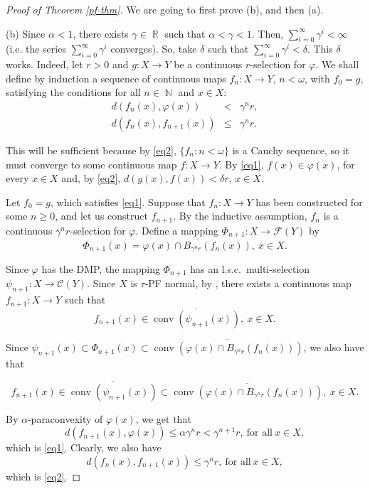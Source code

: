 \documentclass[12pt,a4paper,fleqn,leqno]{amsart}
\theoremstyle{plain}
\theoremstyle{definition}
\numberwithin{equation}{section}
\begin{document}
\begin{proof}[Proof of Theorem \ref{pf-thm}]
We are going to first prove (b), and then (a).\medskip

(b) Since $\alpha<1$, there exists $\gamma\in\operatorname{\mathbb{R}}$ such that $\alpha<\gamma<1$. Then, $\sum^\infty_{i=0}\gamma^i<\infty$ (i.e. the series $\sum^\infty_{i=0}\gamma^i$ converges). So, take $\delta$ such that $\sum_{i=0}^{\infty}\gamma^i< \delta$. This $\delta$ works.
Indeed, let $r>0$ and $g:X\to Y$ be a continuous $r$-selection for $\varphi$. We shall define by induction a sequence of continuous maps $f_n:X\to Y$, $n<\omega$, with $f_0=g$, satisfying the conditions for all $n\in\operatorname{\mathbb{N}}$ and $x\in X$:
\begin{eqnarray}
\label{eq1} d(f_n(x),\varphi(x)) & < & \gamma^nr,\\
\label{eq2} d(f_n(x),f_{n+1}(x)) & \leq &\gamma^nr.
\end{eqnarray}

This will be sufficient because by \eqref{eq2}, $\{f_n:n<\omega\}$ is a Cauchy sequence, so it must converge to some continuous map $f:X\to Y$. By \eqref{eq1}, $f(x)\in\varphi(x)$, for every $x\in X$ and, by \eqref{eq2}, $d(g(x),f(x))<\delta r$, $x\in X$.\medskip

Let $f_0=g$, which satisfies \eqref{eq1}. Suppose that $f_n:X\to Y$ has been constructed for some $n\geq0$, and let us construct $f_{n+1}$. By the inductive assumption, $f_n$ is a continuous $\gamma^nr$-selection for $\varphi$. Define a mapping $\Phi_{n+1}:X\to \mathscr{F}(Y)$ by
\[
\Phi_{n+1}(x)=\overline{\varphi(x)\cap B_{\gamma^nr}(f_n(x))},\ x\in X.
\]

Since $\varphi$ has the DMP, the mapping $\Phi_{n+1}$ has an l.s.c.\ multi-selection $\psi_{n+1}:X\to\mathscr{C}(Y)$. Since $X$ is $\tau$-PF normal, by \cite[Theorem 4.1]{nedev}, there exists a continuous map $f_{n+1}:X\to Y$ such that
\[
f_{n+1}(x)\in\overline{\operatorname{conv}(\psi_{n+1}(x))},\ x\in X.
\]

Since $\psi_{n+1}(x)\subset\Phi_{n+1}(x)\subset\overline{\operatorname{conv}(\varphi(x)\cap B_{\gamma^nr}(f_n(x)))}$, we also have that

\[
f_{n+1}(x)\in\overline{\operatorname{conv}(\psi_{n+1}(x))}\subset\overline{\operatorname{conv}(\varphi(x)\cap B_{\gamma^nr}(f_n(x)))},\ x\in X.
\]

By $\alpha$-paraconvexity of $\varphi(x)$, we get that
\[
d(f_{n+1}(x),\varphi(x))\leq\alpha\gamma^n r<\gamma^{n+1}r,\ \text{for all}\ x\in X,
\]
which is \eqref{eq1}. Clearly, we also have
\[
d(f_n(x),f_{n+1}(x))\leq \gamma^nr,\ \text{for all}\ x\in X,
\]
which is \eqref{eq2}.\medskip


\end{proof}
\end{document}

